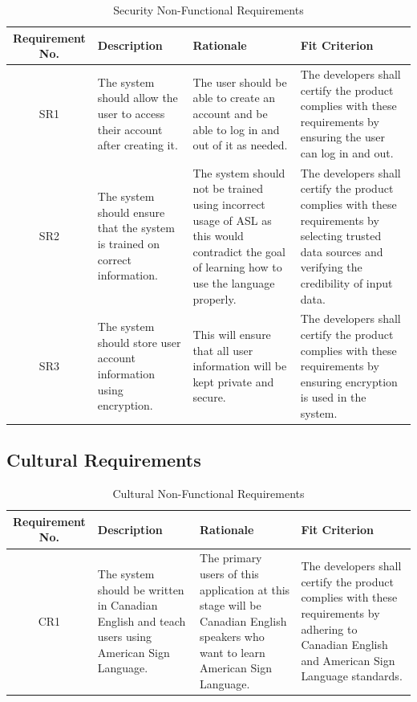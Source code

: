 \documentclass[12pt, titlepage]{article}
\begin{document}
\begin{table}[H]
\caption{Security Non-Functional Requirements}
\noindent \begin{tabular}{| c | p{3cm}| p{3cm}| p{3cm}|}
\hline 
\textbf{Requirement No.} & \textbf{Description} & \textbf{Rationale} & \textbf{Fit Criterion}\\
\hline
SR1 & The system should allow the user to access their account after creating it. & The user should be able to create an account and be able to log in and out of it as needed. & The developers shall certify the product complies with these requirements by ensuring the user can log in and out. \\
\hline
SR2 & The system should ensure that the system is trained on correct information. & The system should not be trained using incorrect usage of ASL as this would contradict the goal of learning how to use the language properly. & The developers shall certify the product complies with these requirements by selecting trusted data sources and verifying the credibility of input data. \\
\hline
SR3 & The system should store user account information using encryption. & This will ensure that all user information will be kept private and secure. & The developers shall certify the product complies with these requirements by ensuring encryption is used in the system. \\
\bottomrule
\end{tabular}
\end{table}

\subsection{Cultural Requirements}

\begin{table}[H]
\caption{Cultural Non-Functional Requirements}
\noindent \begin{tabular}{| c | p{3cm}| p{3cm}| p{3cm}|}
\hline 
\textbf{Requirement No.} & \textbf{Description} & \textbf{Rationale} & \textbf{Fit Criterion}\\
\hline
CR1 & The system should be written in Canadian English and teach users using American Sign Language. & The primary users of this application at this stage will be Canadian English speakers who want to learn American Sign Language. & The developers shall certify the product complies with these requirements by adhering to Canadian English and American Sign Language standards. \\
\bottomrule
\end{tabular}
\end{table}
\end{document}
